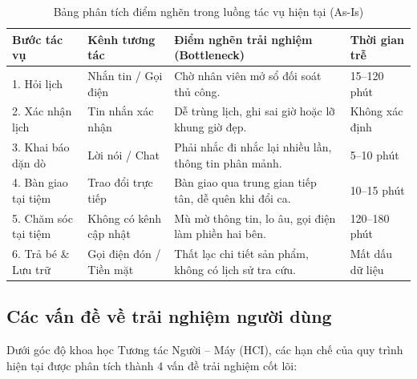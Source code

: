 \begin{table}[H]
\centering
\small
\begin{tabularx}{\textwidth}{|l|l|X|l|}
\hline
\textbf{Bước tác vụ} & \textbf{Kênh tương tác} & \textbf{Điểm nghẽn trải nghiệm (Bottleneck)} & \textbf{Thời gian trễ} \\ \hline
1. Hỏi lịch & Nhắn tin / Gọi điện & Chờ nhân viên mở sổ đối soát thủ công. & 15--120 phút \\ \hline
2. Xác nhận lịch & Tin nhắn xác nhận & Dễ trùng lịch, ghi sai giờ hoặc lỡ khung giờ đẹp. & Không xác định \\ \hline
3. Khai báo dặn dò & Lời nói / Chat & Phải nhắc đi nhắc lại nhiều lần, thông tin phân mảnh. & 5--10 phút \\ \hline
4. Bàn giao tại tiệm & Trao đổi trực tiếp & Bàn giao qua trung gian tiếp tân, dễ quên khi đổi ca. & 10--15 phút \\ \hline
5. Chăm sóc tại tiệm & Không có kênh cập nhật & Mù mờ thông tin, lo âu, gọi điện làm phiền hai bên. & 120--180 phút \\ \hline
6. Trả bé \& Lưu trữ & Gọi điện đón / Tiền mặt & Thất lạc chi tiết sản phẩm, không có lịch sử tra cứu. & Mất dấu dữ liệu \\ \hline
\end{tabularx}
\caption{Bảng phân tích điểm nghẽn trong luồng tác vụ hiện tại (As-Is)}
\label{tab:flow_bottlenecks}
\end{table}

\subsection{Các vấn đề về trải nghiệm người dùng}
Dưới góc độ khoa học Tương tác Người -- Máy (HCI), các hạn chế của quy trình hiện tại được phân tích thành 4 vấn đề trải nghiệm cốt lõi:

